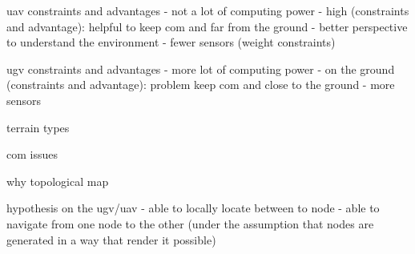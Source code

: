 uav constraints and advantages
- not a lot of computing power
- high (constraints and advantage): helpful to keep com and far from the ground
- better perspective to understand the environment
- fewer sensors (weight constraints)

ugv constraints and advantages
- more lot of computing power
- on the ground (constraints and advantage): problem keep com and close to the ground
- more sensors


terrain types

com issues

why topological map

hypothesis on the ugv/uav
- able to locally locate between to node
- able to navigate from one node to the other (under the assumption that nodes are generated in a way that render it possible)

